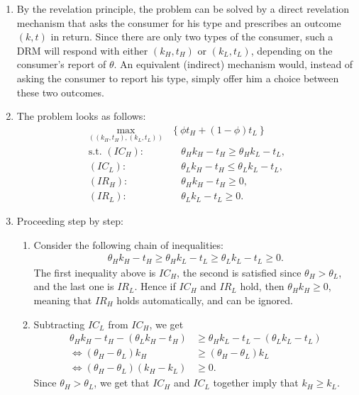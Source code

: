 \documentclass[a4paper]{article}
\begin{document}
\begin{enumerate}
	\item By the revelation principle, the problem can be solved by a direct revelation mechanism that asks the consumer for his type and prescribes an outcome $(k,t)$ in return. Since there are only two types of the consumer, such a DRM will respond with either $(k_H,t_H)$ or $(k_L,t_L)$, depending on the consumer's report of $\theta$. An equivalent (indirect) mechanism would, instead of asking the consumer to report his type, simply offer him a choice between these two outcomes.
	
	\item The problem looks as follows:
	\begin{align*}
		\max_{((k_H,t_H),(k_L,t_L))} & \left\{ \phi t_H + (1-\phi) t_L \right\}
		\\ \text{s.t. } (IC_H):&\quad \theta_H k_H - t_H \geq \theta_H k_L - t_L,
		\\ (IC_L):&\quad \theta_L k_H - t_H \leq \theta_L k_L - t_L,
		\\ (IR_H):&\quad \theta_H k_H - t_H \geq 0,
		\\ (IR_L):&\quad \theta_L k_L - t_L \geq 0.
	\end{align*}
	
	\item Proceeding step by step:
	\begin{enumerate}
		\item Consider the following chain of inequalities:
		\begin{align*}
			\theta_H k_H - t_H \geq \theta_H k_L - t_L
			\geq 
			\theta_L k_L - t_L \geq 0.
		\end{align*}
		The first inequality above is $IC_H$, the second is satisfied since $\theta_H > \theta_L$, and the last one is $IR_L$. Hence if $IC_H$ and $IR_L$ hold, then $\theta_H k_H \geq 0$, meaning that $IR_H$ holds automatically, and can be ignored.
		
		\item Subtracting $IC_L$ from $IC_H$, we get
		\begin{align*}
			\theta_H k_H - t_H - \left( \theta_L k_H - t_H \right) &\geq \theta_H k_L - t_L - \left( \theta_L k_L - t_L \right)
			\\ \iff
			(\theta_H - \theta_L) k_H &\geq (\theta_H - \theta_L) k_L
			\\ \iff
			(\theta_H - \theta_L) (k_H -k_L) &\geq 0.
		\end{align*}
		Since $\theta_H > \theta_L$, we get that $IC_H$ and $IC_L$ together imply that $k_H \geq k_L$.
		

\end{enumerate}
\end{enumerate}
\end{document}
